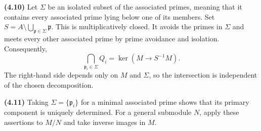 \textbf{(4.10)} Let $\Sigma$ be an isolated subset of the associated primes, meaning that it contains every associated prime lying below one of its members. Set $S=A\setminus\bigcup_{\mathfrak{p}\in\Sigma}\mathfrak{p}$. This is multiplicatively closed. It avoids the primes in $\Sigma$ and meets every other associated prime by prime avoidance and isolation. Consequently,
\[\bigcap_{\mathfrak{p}_i\in\Sigma}Q_i=\ker(M\to S^{-1}M).\]
The right-hand side depends only on $M$ and $\Sigma$, so the intersection is independent of the chosen decomposition.

\textbf{(4.11)} Taking $\Sigma=\{\mathfrak{p}_i\}$ for a minimal associated prime shows that its primary component is uniquely determined. For a general submodule $N$, apply these assertions to $M/N$ and take inverse images in $M$.
